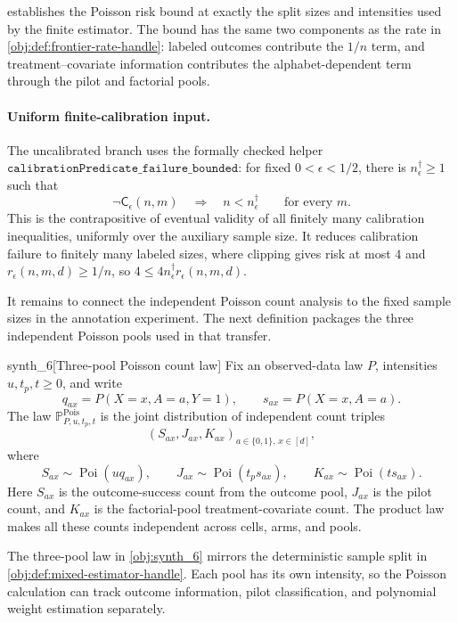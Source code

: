 \documentclass[11pt]{article}
\begin{document}
 establishes the Poisson risk bound at exactly the split sizes and intensities used by the finite estimator. The bound has the same two components as the rate in \cref{obj:def:frontier-rate-handle}: labeled outcomes contribute the \(1/n\) term, and treatment--covariate information contributes the alphabet-dependent term through the pilot and factorial pools.

\paragraph{Uniform finite-calibration input.}
The uncalibrated branch uses the formally checked helper
\(\texttt{calibrationPredicate\_failure\_bounded}\): for fixed \(0<\epsilon<1/2\), there is \(n_\epsilon^\dagger\ge1\) such that
\[
\neg\mathsf C_\epsilon(n,m)\quad\Longrightarrow\quad n<n_\epsilon^\dagger
\qquad\text{for every }m.
\]
This is the contrapositive of eventual validity of all finitely many calibration inequalities, uniformly over the auxiliary sample size. It reduces calibration failure to finitely many labeled sizes, where clipping gives risk at most \(4\) and \(r_\epsilon(n,m,d)\ge1/n\), so \(4\le4n_\epsilon^\dagger r_\epsilon(n,m,d)\).

It remains to connect the independent Poisson count analysis to the fixed sample sizes in the annotation experiment. The next definition packages the three independent Poisson pools used in that transfer.

\begin{definitionv}{synth_6}[Three-pool Poisson count law]
Fix an observed-data law \(P\), intensities \(u,t_p,t\ge0\), and write
\[
q_{ax}=P(X=x,A=a,Y=1),
\qquad
s_{ax}=P(X=x,A=a).
\]
The law \(\mathbb P^{\mathrm{Pois}}_{P,u,t_p,t}\) is the joint distribution of independent count triples
\[
(S_{ax},J_{ax},K_{ax})_{a\in\{0,1\},\,x\in[d]},
\]
where
\[
S_{ax}\sim\operatorname{Poi}(u q_{ax}),\qquad
J_{ax}\sim\operatorname{Poi}(t_p s_{ax}),\qquad
K_{ax}\sim\operatorname{Poi}(t s_{ax}).
\]
Here \(S_{ax}\) is the outcome-success count from the outcome pool, \(J_{ax}\) is the pilot count, and \(K_{ax}\) is the factorial-pool treatment-covariate count. The product law makes all these counts independent across cells, arms, and pools.
\end{definitionv}

The three-pool law in \cref{obj:synth_6} mirrors the deterministic sample split in \cref{obj:def:mixed-estimator-handle}. Each pool has its own intensity, so the Poisson calculation can track outcome information, pilot classification, and polynomial weight estimation separately.
\end{document}
